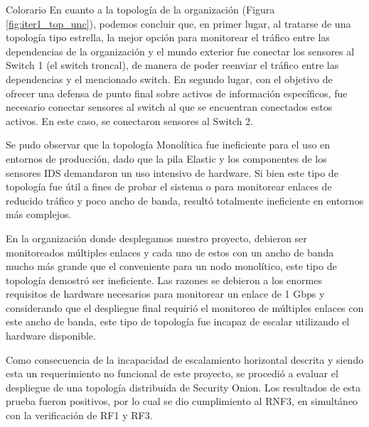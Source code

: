     
    \begin{section}{Colorario}
        En cuanto a la topología de la organización (Figura \ref{fig:iter1_top_unc}), podemos concluir que, en primer lugar, al tratarse de una topología tipo estrella, la mejor opción para monitorear el tráfico entre las dependencias de la organización y el mundo exterior fue conectar los sensores al Switch 1 (el switch troncal), de manera de poder reenviar el tráfico entre las dependencias y el mencionado switch. En segundo lugar, con el objetivo de ofrecer una defensa de punto final sobre activos de información específicos, fue necesario conectar sensores al switch al que se encuentran conectados estos activos. En este caso, se conectaron sensores al Switch 2. \par 
        Se pudo observar que la topología Monolítica fue ineficiente para el uso en entornos de producción, dado que la pila Elastic y los componentes de los sensores IDS demandaron un uso intensivo de hardware. Si bien este tipo de topología fue útil a fines de probar el sistema o para monitorear enlaces de reducido tráfico y poco ancho de banda, resultó totalmente ineficiente en entornos más complejos.\par
        En la organización donde desplegamos nuestro proyecto, debieron ser monitoreados múltiples enlaces y cada uno de estos con un ancho de banda mucho más grande que el conveniente para un nodo monolítico, este tipo de topología demostró ser ineficiente. Las razones se debieron a los enormes requisitos de hardware necesarios para monitorear un enlace de 1 Gbps y considerando que el despliegue final requirió el monitoreo de múltiples enlaces con este ancho de banda, este tipo de topología fue incapaz de escalar utilizando el hardware disponible.\par
        Como consecuencia de la incapacidad de escalamiento horizontal descrita y siendo esta un requerimiento no funcional de este proyecto, se procedió a evaluar el despliegue de una topología distribuida de Security Onion. Los resultados de esta prueba fueron positivos, por lo cual se dio cumplimiento al RNF3, en simultáneo con la verificación de RF1 y RF3.\par

    \end{section}